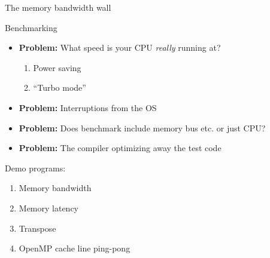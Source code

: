 \documentclass[sans,mathserif]{beamer}
\begin{document}
\begin{frame}
  
  \begin{center}
    \Large The memory bandwidth wall
  \end{center}
\end{frame}

\begin{frame}{Benchmarking}

\begin{itemize}
\item<+-> {\bf Problem:} What speed is your CPU {\em really} running at?
  \begin{enumerate}
  \item Power saving
  \item ``Turbo mode''
  \end{enumerate}
\vspace{0.2cm}
\vspace{0.5cm}

\item<+-> {\bf Problem:} Interruptions from the OS\\
\vspace{0.2cm}
\vspace{0.5cm}

\item<+-> {\bf Problem:} Does benchmark include memory bus etc. or just CPU? \\
\vspace{0.5cm}

\item<+-> {\bf Problem:} The compiler optimizing away the test code

\end{itemize}

\end{frame}

\begin{frame}
Demo programs:
\begin{enumerate}
\item Memory bandwidth
\item Memory latency
\item Transpose
\item OpenMP cache line ping-pong
\end{enumerate}
\end{frame}
\end{document}

